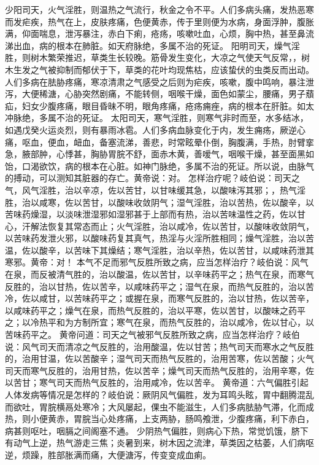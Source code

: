 \documentclass[a4paper,12pt,UTF8,twoside]{ctexbook}
\begin{document}
少阳司天，火气淫胜，则温热之气流行，秋金之令不平。人们多病头痛，发热恶寒而发疟疾，热气在上，皮肤疼痛，色便黄赤，传于里则便为水病，身面浮肿，腹胀满，仰面喘息，泄泻暴注，赤白下痢，疮疡，咳嗽吐血，心烦，胸中热，甚至鼻流涕出血，病的根本在肺脏。如天府脉绝，多属不治的死证。
阳明司天，燥气淫胜，则树木繁荣推迟，草类生长较晚。筋骨发生变化，大凉之气使天气反常，，树木生发之气被抑制而郁伏于下，草类的花叶均现焦枯，应该蛰伏的虫类反而出动。人们多病在胠胁疼痛，寒凉清肃之气感受之后则为疟疾，咳嗽，腹中鸣响，暴注泄泻，大便稀溏，心胁突然剧痛，不能转侧，咽喉干燥，面色如蒙尘，腰痛，男子蘈疝，妇女少腹疼痛，眼目昏昧不明，眼角疼痛，疮疡痈痤，病的根本在肝脏。如太冲脉绝，多属不治的死证。
太阳司天，寒气淫胜，则寒气非时而至，水多结冰，如遇戊癸火运炎烈，则有暴雨冰雹。人们多病血脉变化于内，发生痈疡，厥逆心痛，呕血，便血，衄血，备塞流涕，善悲，时常眩晕仆倒，胸腹满，手热，肘臂挛急，腋部肿，心悸甚，胸胁胃脘不舒，面赤木黄，善嗳气，咽喉干燥，甚至面黑如饴，口渴欲饮，病的根本在心脏。如神门脉绝，多属不治的死证。所以说，由脉气的搏动，可以测知其脏器的存亡。黄帝说：对。
怎样治疗呢？岐伯说：司天之气，风气淫胜，治以辛凉，佐以苦甘，以甘味缓其急，以酸味泻其邪；，热气淫胜，治以咸寒，佐以苦甘，以酸味收敛阴气；湿气淫胜，治以苦热，佐以酸辛，以苦味药燥湿，以淡味泄湿邪如湿邪甚于上部而有热，治以苦味温性之药，佐以甘心，汗解法恢复其常态而止；火气淫胜，治以咸冷，佐以苦甘，以酸味收敛阴气，以苦味药发泄火邪，以酸味药复其真气，热淫与火淫所胜相同；燥气淫胜，治以苦温，佐以酸辛，以苦味下其燥结；寒气淫胜，治以辛热，佐以苦甘，以咸味药泄其寒邪。黄帝：对！
本气不足而邪气反胜所致之病，应当怎样治疗？岐伯说：风气在泉，而反被清气胜的，治以酸温，佐以苦甘，以辛味药平之；热气在泉，而寒气反胜的，治以甘热，佐以苦辛，以咸味药平之；湿气在泉，而热气反胜的，治以苦冷，佐以咸甘，以苦味药平之；或握在泉，而寒气反胜的，治以甘热，佐以苦辛，以咸味药平之；燥气在泉，而热气反胜的，治以平寒，佐以苦甘，以酸味之药平之；以冷热平和为方制所宜；寒气在泉，而热气反胜的，治以咸冷，佐以甘心，以苦味药平之。
黄帝问道：司天之气被邪气反胜所致之病，应当怎样治疗？岐伯说：风气司天而清凉之气反胜的，治用酸温，佐以甘苦；热气司天而寒水之气反胜的，治用甘温，佐以苦酸辛；湿气司天而热气反胜的，治用苦寒，佐以苦酸；火气司天而寒气反胜的，治用甘热，佐以苦辛；燥气司天而热气反胜的，治用辛寒，佐以苦甘；寒气司天而热气反胜的，治用咸冷，佐以苦辛。
黄帝道：六气偏胜引起人体发病等情况是怎样的？岐伯说：厥阴风气偏胜，发为耳鸣头眩，胃中翻腾混乱而欲吐，胃脘横鬲处寒冷；大风屡起，倮虫不能滋生，人们多病胠胁气滞，化而成热，则小便黄赤，胃脘当心处疼痛，上支两胁，肠鸣飧泄，少腹疼痛，利下赤白，病甚则呕吐，咽膈之间阁塞不通。
少阴热气偏胜，则病心下热，常觉饥饿，脐下有动气上逆，热气游走三焦；炎暑到来，树木因之流津，草类因之枯萎，人们病呕逆，烦躁，胜部胀满而痛，大便溏泻，传变变成血痢。
\end{document}
